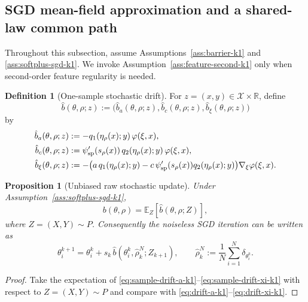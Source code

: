 \documentclass[11pt]{article}
\newtheorem{proposition}[theorem]{Proposition}
\theoremstyle{definition}
\newtheorem{definition}[theorem]{Definition}
\newcommand{\R}{\mathbb{R}}
\newcommand{\E}{\mathbb{E}}
\newcommand{\mc}[1]{\mathcal{#1}}
\begin{document}
\subsection{SGD mean-field approximation and a shared-law common path}

Throughout this subsection, assume Assumptions~\ref{ass:barrier-k1} and
\ref{ass:softplus-sgd-k1}. We invoke
Assumption~\ref{ass:feature-second-k1} only when second-order feature
regularity is needed.

\begin{definition}[One-sample stochastic drift]
\label{def:sample-drift-k1}
For $z=(x,y)\in \mc{X}\times\R$, define
\[
  \hat b(\theta,\rho;z)
  :=
  \bigl(\hat b_a(\theta,\rho;z),\hat b_c(\theta,\rho;z),\hat b_\xi(\theta,\rho;z)\bigr)
\]
by
\begin{align}
  \hat b_a(\theta,\rho;z)
  &:=
  -q_1(\eta_\rho(x);y)\,\varphi(\xi,x),
  \label{eq:sample-drift-a-k1}
  \\
  \hat b_c(\theta,\rho;z)
  &:=
  \psi'_{\rm sp}(s_\rho(x))\,q_2(\eta_\rho(x);y)\,\varphi(\xi,x),
  \label{eq:sample-drift-c-k1}
  \\
  \hat b_\xi(\theta,\rho;z)
  &:=
  -
  \bigl(
    a\,q_1(\eta_\rho(x);y)
    -
    c\,\psi'_{\rm sp}(s_\rho(x))q_2(\eta_\rho(x);y)
  \bigr)\nabla_\xi\varphi(\xi,x).
  \label{eq:sample-drift-xi-k1}
\end{align}
\end{definition}

\begin{proposition}[Unbiased raw stochastic update]
\label{prop:unbiased-sample-drift-k1}
Under Assumption~\ref{ass:softplus-sgd-k1},
\[
  b(\theta,\rho)=\E_Z[\hat b(\theta,\rho;Z)],
\]
where $Z=(X,Y)\sim P$. Consequently the noiseless SGD iteration can be written
as
\begin{equation}
  \theta_i^{k+1}
  =
  \theta_i^k
  +
  s_k\,\hat b(\theta_i^k,\hat\rho_k^N;Z_{k+1}),
  \qquad
  \hat\rho_k^N:=\frac1N\sum_{i=1}^N \delta_{\theta_i^k}.
  \label{eq:sgd-update-k1}
\end{equation}
\end{proposition}

\begin{proof}
Take the expectation of
\eqref{eq:sample-drift-a-k1}--\eqref{eq:sample-drift-xi-k1}
with respect to $Z=(X,Y)\sim P$ and compare with
\eqref{eq:drift-a-k1}--\eqref{eq:drift-xi-k1}.
\end{proof}
\end{document}
